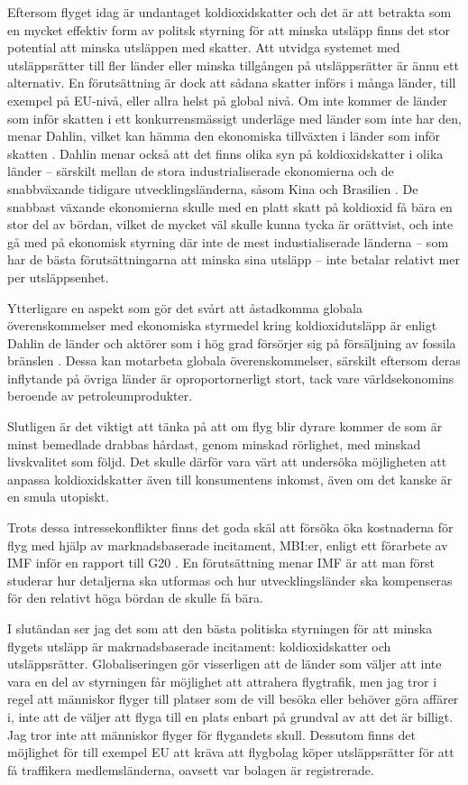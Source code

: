 \documentclass{article}
\begin{document}
Eftersom flyget idag är undantaget koldioxidskatter  och det är att betrakta som en mycket effektiv form av politsk styrning för att minska utsläpp finns det stor potential att minska utsläppen med skatter. Att utvidga systemet med utsläppsrätter till fler länder eller minska tillgången på utsläppsrätter är ännu  ett alternativ. En förutsättning är dock att sådana skatter införs i många länder, till exempel på EU-nivå, eller allra helst på global nivå. Om inte kommer de länder som inför skatten i ett konkurrensmässigt underläge med länder som inte har den, menar Dahlin, vilket kan hämma den ekonomiska tillväxten i länder som inför skatten . Dahlin menar också att det finns olika syn på koldioxidskatter i olika länder – särskilt mellan de stora industrialiserade ekonomierna och de snabbväxande tidigare utvecklingsländerna, såsom Kina och Brasilien . De snabbast växande ekonomierna skulle med en platt skatt på koldioxid få bära en stor del av bördan, vilket de mycket väl skulle kunna tycka är orättvist, och inte gå med på ekonomisk styrning där inte de mest industialiserade länderna – som har de bästa förutsättningarna att minska sina utsläpp – inte betalar relativt mer per utsläppsenhet.

Ytterligare en aspekt som gör det svårt att åstadkomma globala överenskommelser med ekonomiska styrmedel kring koldioxidutsläpp är enligt Dahlin de länder och aktörer som i hög grad försörjer sig på försäljning av fossila bränslen . Dessa kan motarbeta globala överenskommelser, särskilt eftersom deras inflytande på övriga länder är oproportornerligt stort, tack vare världsekonomins beroende av petroleumprodukter.

Slutligen är det viktigt att tänka på att om flyg blir dyrare kommer de som är minst bemedlade drabbas hårdast, genom minskad rörlighet, med minskad livskvalitet som följd. Det skulle därför vara värt att undersöka möjligheten att anpassa koldioxidskatter även till konsumentens inkomst, även om det kanske är en smula utopiskt.


Trots dessa intressekonflikter finns det goda skäl att försöka öka kostnaderna för flyg med hjälp av marknadsbaserade incitament, MBI:er, enligt ett förarbete av IMF inför en rapport till G20 . En förutsättning menar IMF är att man först studerar hur detaljerna ska utformas och hur utvecklingsländer ska kompenseras för den relativt höga bördan de skulle få bära.

I slutändan ser jag det som att den bästa politiska styrningen för att minska flygets utsläpp är makrnadsbaserade incitament: koldioxidskatter och utsläppsrätter. Globaliseringen gör visserligen att de länder som väljer att inte vara en del av styrningen får möjlighet att attrahera flygtrafik, men jag tror i regel att människor flyger till platser som de vill besöka eller behöver göra affärer i, inte att de väljer att flyga till en plats enbart på grundval av att det är billigt. Jag tror inte att människor flyger för flygandets skull. Dessutom finns det möjlighet för till exempel EU att kräva att flygbolag köper utsläppsrätter för att få traffikera medlemsländerna, oavsett var bolagen är registrerade.
\end{document}
